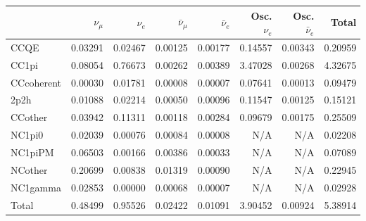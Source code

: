 \begin{tabular} { | l ||r | r | r | r | r | r | | r | }
\hline
              & $\nu_\mu$            & $\nu_e$              & $\bar{\nu}_{\mu}$    & $\bar{\nu}_{e}$      & Osc. $\nu_e$         & Osc. $\bar{\nu}_{e}$ & Total                \\ \hline\hline
 CCQE         & 0.03291              & 0.02467              & 0.00125              & 0.00177              & 0.14557              & 0.00343              & 0.20959              \\ \hline
 CC1pi        & 0.08054              & 0.76673              & 0.00262              & 0.00389              & 3.47028              & 0.00268              & 4.32675              \\ \hline
 CCcoherent   & 0.00030              & 0.01781              & 0.00008              & 0.00007              & 0.07641              & 0.00013              & 0.09479              \\ \hline
 2p2h         & 0.01088              & 0.02214              & 0.00050              & 0.00096              & 0.11547              & 0.00125              & 0.15121              \\ \hline
 CCother      & 0.03942              & 0.11311              & 0.00118              & 0.00284              & 0.09679              & 0.00175              & 0.25509              \\ \hline
 NC1pi0       & 0.02039              & 0.00076              & 0.00084              & 0.00008              & N/A                  & N/A                  & 0.02208              \\ \hline
 NC1piPM      & 0.06503              & 0.00166              & 0.00386              & 0.00033              & N/A                  & N/A                  & 0.07089              \\ \hline
 NCother      & 0.20699              & 0.00838              & 0.01319              & 0.00090              & N/A                  & N/A                  & 0.22945              \\ \hline
 NC1gamma     & 0.02853              & 0.00000              & 0.00068              & 0.00007              & N/A                  & N/A                  & 0.02928              \\ \hline
\hline
 Total        & 0.48499              & 0.95526              & 0.02422              & 0.01091              & 3.90452              & 0.00924              & 5.38914              \\ \hline

\end{tabular}
